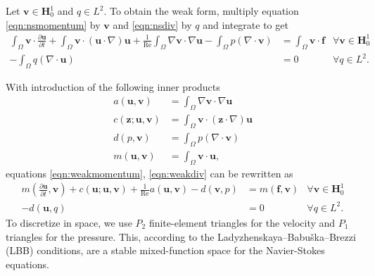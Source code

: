 \documentclass{article}
\newcommand{\mat}[1]{\bm{{#1}}}
\renewcommand{\vec}[1]{\bm{{#1}}}
\newcommand{\grad}{\nabla}
\renewcommand{\Re}{\text{Re}}
\begin{document}
Let $\vec{v} \in \mat{H}^1_0$ and $q \in L^2$.  To obtain the weak form, multiply equation \eqref{eqn:nsmomentum} by $\vec{v}$ and \eqref{eqn:nsdiv} by $q$ and integrate to get
\begin{align}
  \int_\Omega \vec{v} \cdot \frac{\partial \vec{u}}{\partial t} + \int_\Omega \vec{v} \cdot \left(\vec{u} \cdot \grad\right)\vec{u} + \frac{1}{\Re} \int_\Omega \grad\vec{v} \cdot \grad\vec{u} - \int_\Omega p \left( \grad \cdot \vec{v} \right) &= \int_\Omega \vec{v} \cdot \vec{f}  & \forall \vec{v} \in \mat{H}^1_0 \label{eqn:weakmomentum} \\
  -\int_\Omega q \left( \grad \cdot \vec{u} \right) &= 0 & \forall q \in L^2. \label{eqn:weakdiv}
\end{align}

With introduction of the following inner products
\begin{align}
  a\left(\vec{u},\vec{v}\right) &= \int_\Omega \grad \vec{v} \cdot \grad \vec{u} \\
  c\left(\vec{z}; \vec{u}, \vec{v}\right) &= \int_\Omega \vec{v} \cdot \left(\vec{z} \cdot \grad\right)\vec{u} \\
  d\left(p, \vec{v}\right) &= \int_\Omega p\left(\grad \cdot \vec{v}\right) \\
  m\left(\vec{u},\vec{v}\right) &= \int_\Omega \vec{v} \cdot \vec{u},
\end{align}
equations \eqref{eqn:weakmomentum}, \eqref{eqn:weakdiv} can be rewritten as
\begin{align}
  m\left(\frac{\partial \vec{u}}{\partial t},\vec{v}\right) + c\left(\vec{u};\vec{u},\vec{v}\right) + \frac{1}{\Re} a\left(\vec{u},\vec{v}\right) - d\left(\vec{v},p\right) &= m\left(\vec{f}, \vec{v}\right) & \forall \vec{v} \in \mat{H}^1_0 \label{eqn:innermomentum} \\
  -d\left(\vec{u},q\right) &= 0 & \forall q \in L^2. \label{eqn:innerdiv}
\end{align}
To discretize in space, we use $P_2$ finite-element triangles for the velocity and $P_1$ triangles for the pressure.  This, according to the Ladyzhenskaya–Babu\v{s}ka–Brezzi (LBB) conditions, are a stable mixed-function space for the Navier-Stokes equations.
\end{document}
